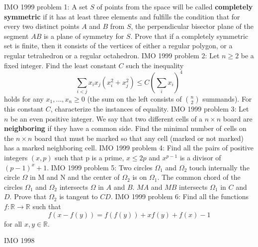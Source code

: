 IMO 1999 problem 1:  A set $ S$ of points from the space will be called \textbf{completely symmetric} if it has at least three elements and fulfills the condition that for every two distinct points $ A$ and $ B$ from $ S$, the perpendicular bisector plane of the segment $ AB$ is a plane of symmetry for $ S$. Prove that if a completely symmetric set is finite, then it consists of the vertices of either a regular polygon, or a regular tetrahedron or a regular octahedron. 
IMO 1999 problem 2:  Let $n \geq 2$ be a fixed integer. Find the least constant $C$ such the inequality
\[ \sum_{i<j} x_ix_j \left(x^2_i+x^2_j \right) \leq C
\left(\sum_ix_i \right)^4 \]
holds for any $x_1, \ldots ,x_n \geq 0$ (the sum on the left consists of $\binom{n}{2}$ summands). For this constant $C$, characterize the instances of equality. 
IMO 1999 problem 3:  Let $n$ be an even positive integer. We say that two different cells of a $n \times n$ board are \textbf{neighboring} if they have a common side. Find the minimal number of cells on the $n \times n$ board that must be marked so that any cell (marked or not marked) has a marked neighboring cell. 
IMO 1999 problem 4:  Find all the pairs of positive integers $(x,p)$ such that p is a prime, $x \leq 2p$ and $x^{p-1}$ is a divisor of $ (p-1)^x+1$. 
IMO 1999 problem 5:  Two circles $\Omega_1$ and $\Omega_2$ touch internally the circle $\Omega$ in M and N and the center of $\Omega_2$ is on $\Omega_1$. The common chord of the circles $\Omega_1$ and $\Omega_2$ intersects $\Omega$ in $A$ and $B$. $MA$ and $MB$ intersects $\Omega_1$ in $C$ and $D$. Prove that $\Omega_2$ is tangent to $CD$. 
IMO 1999 problem 6:  Find all the functions $f: \mathbb{R} \to\mathbb{R}$ such that
\[ f(x-f(y))=f(f(y))+xf(y)+f(x)-1 \]
for all $x,y \in \mathbb{R} $. 

IMO 1998 

